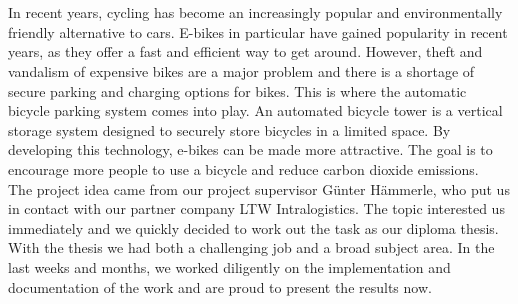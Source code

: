 \section*{}
In recent years, cycling has become an increasingly popular and environmentally friendly alternative to cars. E-bikes in particular have gained popularity in recent years, as they offer a fast and efficient way to get around. However, theft and vandalism of expensive bikes are a major problem and there is a shortage of secure parking and charging options for bikes. This is where the automatic bicycle parking system comes into play. An automated bicycle tower is a vertical storage system designed to securely store bicycles in a limited space. By developing this technology, e-bikes can be made more attractive. The goal is to encourage more people to use a bicycle and reduce carbon dioxide emissions.\\
The project idea came from our project supervisor Günter Hämmerle, who put us in contact with our partner company LTW Intralogistics. The topic interested us immediately and we quickly decided to work out the task as our diploma thesis.\\
With the thesis we had both a challenging job and a broad subject area. In the last weeks and months, we worked diligently on the implementation and documentation of the work and are proud to present the results now.\\
